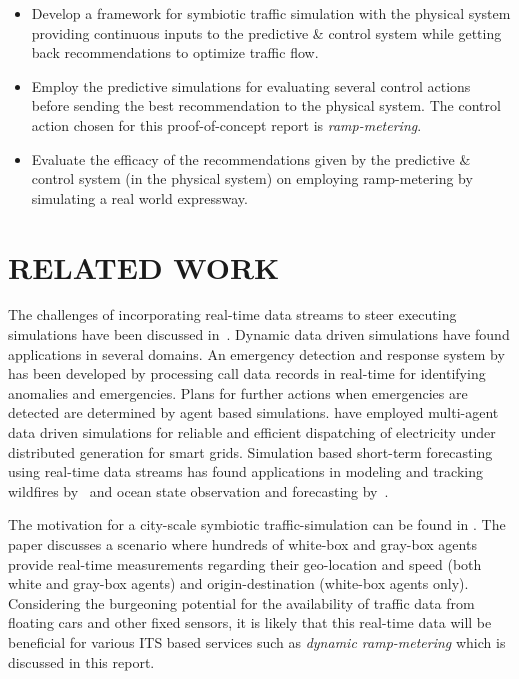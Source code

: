\documentclass[12pt]{article}
\begin{document}
\begin{itemize}
\item Develop a framework for symbiotic traffic simulation with the physical system providing continuous inputs to the predictive \& control system while getting back recommendations to optimize traffic flow.
\item Employ the predictive simulations for evaluating several control actions before sending the best recommendation to the physical system. The control action chosen for this proof-of-concept report is {\it ramp-metering}.
\item Evaluate the efficacy of the recommendations given by the predictive \& control system (in the physical system) on employing ramp-metering by simulating a real world expressway.
\end{itemize}

\section{RELATED WORK}
The challenges of incorporating real-time data streams to steer executing simulations have been discussed in~\cite{darema2004dynamic}. Dynamic data driven simulations have found applications in several domains. An emergency detection and response system by~\cite{schoenharl2006wiper} has been developed by processing call data records in real-time for identifying anomalies and emergencies. Plans for further actions when emergencies are detected are determined by agent based simulations. \cite{celik2013dddams} have employed multi-agent data driven simulations for reliable and efficient dispatching of electricity under distributed generation for smart grids. Simulation based short-term forecasting using real-time data streams has found applications in modeling and tracking wildfires by~\cite{douglas2006dddas} and ocean state observation and forecasting by~\cite{patrikalakis2004towards}. 
 
The motivation for a city-scale symbiotic traffic-simulation can be found in \cite{aydt2012symbiotic}. The paper discusses a scenario where hundreds of white-box and gray-box agents provide real-time measurements regarding their geo-location and speed (both white and gray-box agents) and origin-destination (white-box agents only). Considering the burgeoning potential for the availability of traffic data from floating cars and other fixed sensors, it is likely that this real-time data will be beneficial for various ITS based services such as {\it dynamic ramp-metering} which is discussed in this report.
\end{document}
